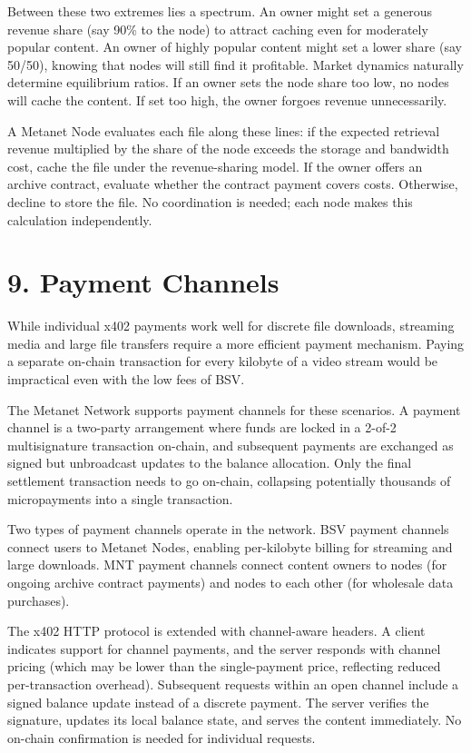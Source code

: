 \documentclass[11pt,a4paper]{article}
\begin{document}
Between these two extremes lies a spectrum. An owner might set a generous revenue share (say 90\% to the node) to attract caching even for moderately popular content. An owner of highly popular content might set a lower share (say 50/50), knowing that nodes will still find it profitable. Market dynamics naturally determine equilibrium ratios. If an owner sets the node share too low, no nodes will cache the content. If set too high, the owner forgoes revenue unnecessarily.

A Metanet Node evaluates each file along these lines: if the expected retrieval revenue multiplied by the share of the node exceeds the storage and bandwidth cost, cache the file under the revenue-sharing model. If the owner offers an archive contract, evaluate whether the contract payment covers costs. Otherwise, decline to store the file. No coordination is needed; each node makes this calculation independently.

\section{9. Payment Channels}

While individual x402 payments work well for discrete file downloads, streaming media and large file transfers require a more efficient payment mechanism. Paying a separate on-chain transaction for every kilobyte of a video stream would be impractical even with the low fees of BSV.

The Metanet Network supports payment channels for these scenarios. A payment channel is a two-party arrangement where funds are locked in a 2-of-2 multisignature transaction on-chain, and subsequent payments are exchanged as signed but unbroadcast updates to the balance allocation. Only the final settlement transaction needs to go on-chain, collapsing potentially thousands of micropayments into a single transaction.

Two types of payment channels operate in the network. BSV payment channels connect users to Metanet Nodes, enabling per-kilobyte billing for streaming and large downloads. MNT payment channels connect content owners to nodes (for ongoing archive contract payments) and nodes to each other (for wholesale data purchases).

The x402 HTTP protocol is extended with channel-aware headers. A client indicates support for channel payments, and the server responds with channel pricing (which may be lower than the single-payment price, reflecting reduced per-transaction overhead). Subsequent requests within an open channel include a signed balance update instead of a discrete payment. The server verifies the signature, updates its local balance state, and serves the content immediately. No on-chain confirmation is needed for individual requests.
\end{document}
